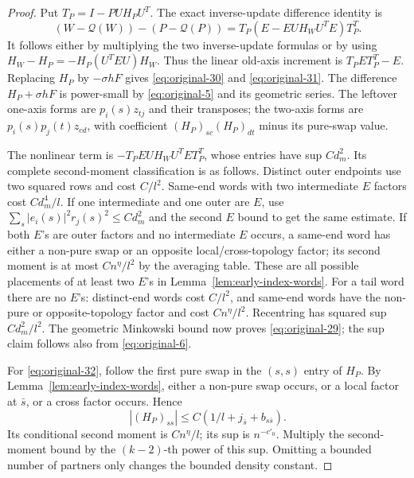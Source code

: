 \begin{proof}
Put \(T_P=I-PUH_PU^T\). The exact inverse-update difference identity
is
\[
 (W-\mathcal Q(W))-(P-\mathcal Q(P))
 =T_P(E-EUH_WU^TE)T_P^T.
\]
It follows either by multiplying the two inverse-update formulas or
by using
\(H_W-H_P=-H_P(U^TEU)H_W\).
Thus the linear old-axis increment is \(T_PET_P^T-E\).
Replacing \(H_P\) by \(-\sigma hF\) gives
\eqref{eq:original-30} and \eqref{eq:original-31}.
The difference \(H_P+\sigma hF\) is power-small by
\eqref{eq:original-5} and its geometric series. The leftover
one-axis forms are \(p_i(s)z_{tj}\) and their transposes; the
two-axis forms are \(p_i(s)p_j(t)z_{cd}\), with coefficient
\((H_P)_{sc}(H_P)_{dt}\) minus its pure-swap value.

The nonlinear term is \(-T_PEUH_WU^TET_P^T\), whose entries
have sup \(Cd_m^2\). Its complete second-moment classification is
as follows. Distinct outer endpoints use two squared rows and cost
\(C/l^2\). Same-end words with two intermediate \(E\) factors
cost \(Cd_m^4/l\). If one intermediate and one outer are \(E\),
use \(\sum_s|e_i(s)|^2r_j(s)^2\le Cd_m^2\) and the second
\(E\) bound to get the same estimate. If both \(E\)'s are
outer factors and no intermediate \(E\) occurs, a same-end word
has either a non-pure swap or an opposite local/cross-topology
factor; its second moment is at most \(Cn^\eta/l^2\) by the
averaging table. These are all possible placements of at least two
\(E\)'s in Lemma~\ref{lem:early-index-words}.
For a tail word there are no \(E\)'s: distinct-end words cost
\(C/l^2\), and same-end words have the non-pure or opposite-topology
factor and cost \(Cn^\eta/l^2\). Recentring has squared sup
\(Cd_m^2/l^2\). The geometric Minkowski bound now proves
\eqref{eq:original-29}; the sup claim follows also from
\eqref{eq:original-6}.

For \eqref{eq:original-32}, follow the first pure swap in the
\((s,s)\) entry of \(H_P\). By
Lemma~\ref{lem:early-index-words}, either a non-pure swap occurs,
or a local factor at \(\bar s\), or a cross factor occurs. Hence
\[
 |(H_P)_{ss}|\le C(1/l+j_{\bar s}+b_{s\bar s}).
\]
Its conditional second moment is \(Cn^\eta/l\); its sup is
\(n^{-c'_0}\). Multiply the second-moment bound by the
\((k-2)\)-th power of this sup. Omitting a bounded number of
partners only changes the bounded density constant.
\end{proof}


